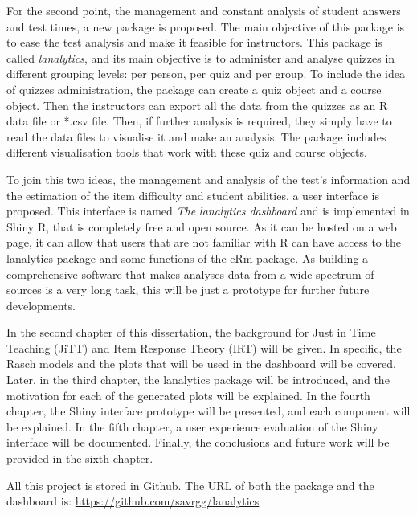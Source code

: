For the second point, the management and constant analysis of student answers and test times, a new package is proposed. The main objective of this package is to ease the test analysis and make it feasible for instructors. This package is called \textit{lanalytics}, and its main objective is to administer and analyse quizzes in different grouping levels: per person, per quiz and per group. To include the idea of quizzes administration, the package can create a quiz object and a course object. Then the instructors can export all the data from the quizzes as an R data file or *.csv file. Then, if further analysis is required, they simply have to read the data files to visualise it and make an analysis. The package includes different visualisation tools that work with these quiz and course objects.

To join this two ideas, the management and analysis of the test's information and the estimation of the item difficulty and student abilities, a user interface is proposed. This interface is named \textit{The lanalytics dashboard} and is implemented in Shiny R, that is completely free and open source. As it can be hosted on a web page, it can allow that users that are not familiar with R can have access to the lanalytics package and some functions of the eRm package. As building a comprehensive software that makes analyses data from a wide spectrum of sources is a very long task, this will be just a prototype for further future developments.

In the second chapter of this dissertation, the background for Just in Time Teaching (JiTT) and Item Response Theory (IRT) will be given. In specific, the Rasch models and the plots that will be used in the dashboard will be covered. Later, in the third chapter, the lanalytics package will be introduced, and the motivation for each of the generated plots will be explained. In the fourth chapter, the Shiny interface prototype will be presented, and each component will be explained. In the fifth chapter, a user experience evaluation of the Shiny interface will be documented. Finally, the conclusions and future work will be provided in the sixth chapter.

All this project is stored in Github. The URL of both the package and the dashboard is: \url{https://github.com/savrgg/lanalytics}